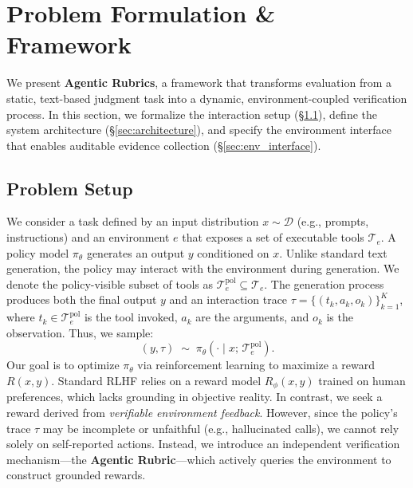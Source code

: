 
\section{Problem Formulation \& Framework}
\label{sec:framework}

We present \textbf{Agentic Rubrics}, a framework that transforms evaluation from a static, text-based judgment task into a dynamic, environment-coupled verification process.
In this section, we formalize the interaction setup (\S\ref{sec:setup}), define the system architecture (\S\ref{sec:architecture}), and specify the environment interface that enables auditable evidence collection (\S\ref{sec:env_interface}).

\subsection{Problem Setup}
\label{sec:setup}

We consider a task defined by an input distribution $x \sim \mathcal{D}$ (e.g., prompts, instructions) and an environment $e$ that exposes a set of executable tools $\mathcal{T}_e$.
A policy model $\pi_\theta$ generates an output $y$ conditioned on $x$.
Unlike standard text generation, the policy may interact with the environment during generation.
We denote the policy-visible subset of tools as $\mathcal{T}_e^{\text{pol}} \subseteq \mathcal{T}_e$.
The generation process produces both the final output $y$ and an interaction trace $\tau = \{(t_k, a_k, o_k)\}_{k=1}^{K}$, where $t_k \in \mathcal{T}_e^{\text{pol}}$ is the tool invoked, $a_k$ are the arguments, and $o_k$ is the observation.
Thus, we sample:
\begin{equation}
(y, \tau) \;\sim\; \pi_\theta(\cdot \mid x;\, \mathcal{T}_e^{\text{pol}}).
\end{equation}
Our goal is to optimize $\pi_\theta$ via reinforcement learning to maximize a reward $R(x, y)$.
Standard RLHF relies on a reward model $R_\phi(x, y)$ trained on human preferences, which lacks grounding in objective reality.
In contrast, we seek a reward derived from \textit{verifiable environment feedback}.
However, since the policy's trace $\tau$ may be incomplete or unfaithful (e.g., hallucinated calls), we cannot rely solely on self-reported actions.
Instead, we introduce an independent verification mechanism—the \textbf{Agentic Rubric}—which actively queries the environment to construct grounded rewards.

